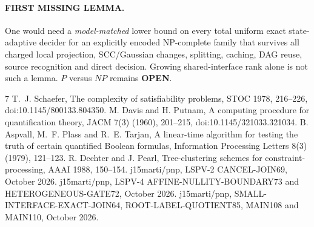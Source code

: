 \documentclass[11pt]{article}
\newcommand{\OPEN}{\textbf{OPEN}}
\begin{document}
\paragraph{FIRST MISSING LEMMA.}
One would need a \emph{model-matched} lower bound
on every total uniform exact state-adaptive decider
for an explicitly encoded NP-complete family
that survives all charged local projection,
SCC/Gaussian changes, splitting, caching, DAG reuse,
source recognition and direct decision. Growing
shared-interface rank alone is not such a lemma.
$P$ versus $NP$ remains \OPEN{}.

\begin{thebibliography}{7}
 T.~J. Schaefer,
The complexity of satisfiability problems,
STOC 1978, 216--226,
doi:10.1145/800133.804350.
 M. Davis and H. Putnam,
A computing procedure for quantification theory,
JACM 7(3) (1960), 201--215,
doi:10.1145/321033.321034.
 B. Aspvall, M.~F. Plass and R.~E. Tarjan,
A linear-time algorithm for testing the truth of
certain quantified Boolean formulas,
Information Processing Letters 8(3) (1979), 121--123.
 R. Dechter and J. Pearl,
Tree-clustering schemes for constraint-processing,
AAAI 1988, 150--154.
 j15marti/pnp,
LSPV-2 CANCEL-JOIN69, October 2026.
 j15marti/pnp,
LSPV-4 AFFINE-NULLITY-BOUNDARY73
and HETEROGENEOUS-GATE72, October 2026.
 j15marti/pnp,
SMALL-INTERFACE-EXACT-JOIN64,
ROOT-LABEL-QUOTIENT85, MAIN108 and MAIN110,
October 2026.
\end{thebibliography}
\end{document}
